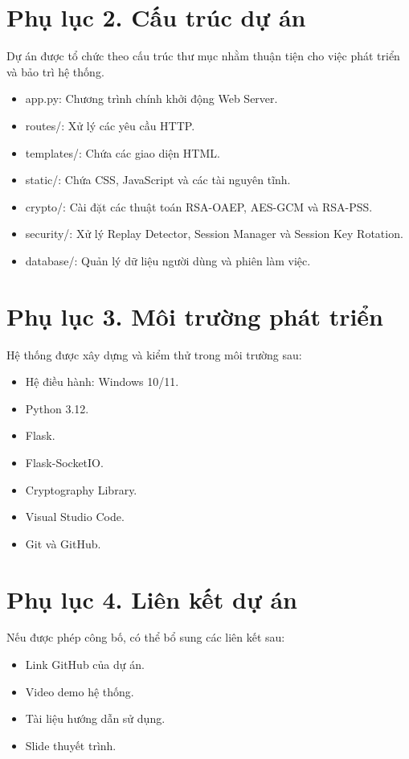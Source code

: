 \section*{Phụ lục 2. Cấu trúc dự án}

Dự án được tổ chức theo cấu trúc thư mục nhằm thuận tiện cho việc phát triển và bảo trì hệ thống.

\begin{itemize}
    \item app.py: Chương trình chính khởi động Web Server.
    \item routes/: Xử lý các yêu cầu HTTP.
    \item templates/: Chứa các giao diện HTML.
    \item static/: Chứa CSS, JavaScript và các tài nguyên tĩnh.
    \item crypto/: Cài đặt các thuật toán RSA-OAEP, AES-GCM và RSA-PSS.
    \item security/: Xử lý Replay Detector, Session Manager và Session Key Rotation.
    \item database/: Quản lý dữ liệu người dùng và phiên làm việc.
\end{itemize}

\section*{Phụ lục 3. Môi trường phát triển}

Hệ thống được xây dựng và kiểm thử trong môi trường sau:

\begin{itemize}
    \item Hệ điều hành: Windows 10/11.
    \item Python 3.12.
    \item Flask.
    \item Flask-SocketIO.
    \item Cryptography Library.
    \item Visual Studio Code.
    \item Git và GitHub.
\end{itemize}

\section*{Phụ lục 4. Liên kết dự án}

Nếu được phép công bố, có thể bổ sung các liên kết sau:

\begin{itemize}
    \item Link GitHub của dự án.
    \item Video demo hệ thống.
    \item Tài liệu hướng dẫn sử dụng.
    \item Slide thuyết trình.
\end{itemize}